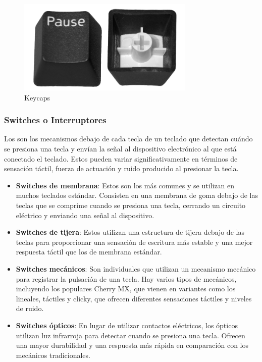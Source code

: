 \begin{figure}[H]
    \centering
    \includegraphics[width=0.75\textwidth]{imagenes/Capitulos/Cap03/Keycaps.png}
    \caption{Keycaps \cite{KeycapsImageSource}}
    \label{fig:Keycaps}
\end{figure}

\subsubsection{\gls{Switches} o Interruptores}

Los  son los mecanismos debajo de cada tecla de un teclado que detectan cuándo se presiona una tecla y envían la señal al dispositivo electrónico al que está conectado el teclado. Estos  pueden variar significativamente en términos de sensación táctil, fuerza de actuación y ruido producido al presionar la tecla.

\begin{itemize}
  \item \textbf{\gls{Switches} de membrana}: Estos son los más comunes y se utilizan en muchos teclados estándar. Consisten en una membrana de goma debajo de las teclas que se comprime cuando se presiona una tecla, cerrando un circuito eléctrico y enviando una señal al dispositivo.
  
  \item \textbf{\gls{Switches} de tijera}: Estos  utilizan una estructura de tijera debajo de las teclas para proporcionar una sensación de escritura más estable y una mejor respuesta táctil que los  de membrana estándar.
  
  \item \textbf{\gls{Switches} mecánicos}: Son  individuales que utilizan un mecanismo mecánico para registrar la pulsación de una tecla. Hay varios tipos de  mecánicos, incluyendo los populares  Cherry MX, que vienen en variantes como los  lineales, táctiles y clicky, que ofrecen diferentes sensaciones táctiles y niveles de ruido.
  
  \item \textbf{\gls{Switches} ópticos}: En lugar de utilizar contactos eléctricos, los  ópticos utilizan luz infrarroja para detectar cuando se presiona una tecla. Ofrecen una mayor durabilidad y una respuesta más rápida en comparación con los  mecánicos tradicionales.
\end{itemize}

